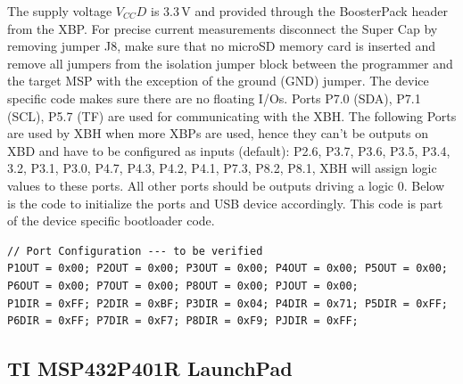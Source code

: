 \documentclass[twoside,11pt]{cergdoc}
\begin{document}
\noindent The supply voltage $V_{CC}D$ is 3.3\,V and provided through the BoosterPack header 
from the XBP.
For precise current measurements 
disconnect the Super Cap by removing jumper J8, make sure that no microSD 
memory card is inserted and
remove all jumpers from the isolation jumper block 
between the programmer and the target MSP with the exception of the ground (GND) jumper. 
The device specific code makes sure there are no floating I/Os. 
Ports P7.0 (SDA), P7.1 (SCL), P5.7 (TF) are used for communicating with the XBH.
The following Ports are used by XBH when more XBPs are used, hence they can't be outputs on XBD
and have to be configured as inputs (default): 
P2.6,
P3.7, P3.6, P3.5, P3.4, 3.2, P3.1, P3.0,
P4.7, P4.3, P4.2, P4.1,
P7.3,
P8.2, P8.1,
XBH will assign logic values to these ports.
All other ports should be outputs driving a logic 0. 
Below is the code to initialize the ports and USB device
accordingly. 
This code is part of the device specific bootloader code.

{\small
\begin{lstlisting}
// Port Configuration --- to be verified
P1OUT = 0x00; P2OUT = 0x00; P3OUT = 0x00; P4OUT = 0x00; P5OUT = 0x00;
P6OUT = 0x00; P7OUT = 0x00; P8OUT = 0x00; PJOUT = 0x00;
P1DIR = 0xFF; P2DIR = 0xBF; P3DIR = 0x04; P4DIR = 0x71; P5DIR = 0xFF;
P6DIR = 0xFF; P7DIR = 0xF7; P8DIR = 0xF9; PJDIR = 0xFF;
\end{lstlisting}
}


%
%

\subsection{TI MSP432P401R LaunchPad\texttrademark}
\end{document}
